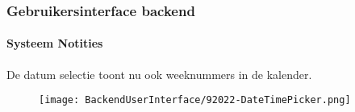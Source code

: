 %

\begin{frame}[fragile]
	\frametitle{Gebruikersinterface backend}
	\framesubtitle{Systeem Notities}

	De datum selectie toont nu ook weeknummers in de kalender.

	\begin{figure}
		\texttt{[image: BackendUserInterface/92022-DateTimePicker.png]}
	\end{figure}

\end{frame}

